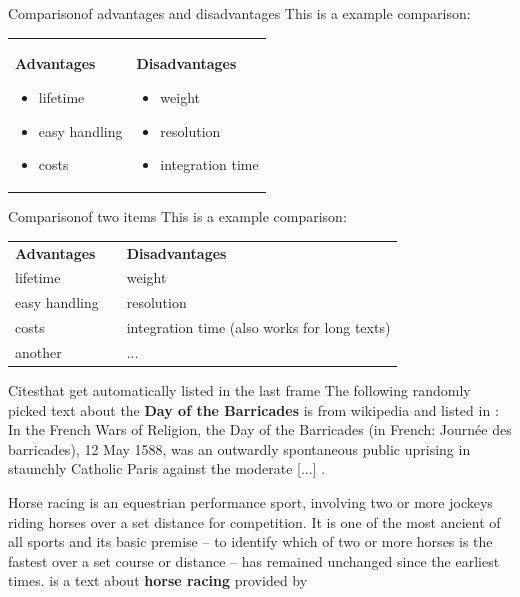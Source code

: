 \documentclass[
	12pt, 				%
	t,					%
	aspectratio=169,	%
	]{beamer}
\begin{document}
	
	\begin{frame}{Comparison}{of advantages and disadvantages}
		This is a example comparison:
		\begin{center}
		\begin{tabularx}{0.8\textwidth}{X|X}
			\textbf{Advantages}
			 \begin{itemize}[<2->]
			 	\item lifetime
			 	\item easy handling
			 	\item costs
			 \end{itemize} &
			\textbf{Disadvantages}
			 \begin{itemize}[<3->]
			 	\item weight
			 	\item resolution
			 	\item integration time
			 \end{itemize}
		\end{tabularx}
		\end{center}
	\end{frame}
	
	
	\begin{frame}{Comparison}{of two items}
		This is a example comparison:
		\begin{center}
		\begin{tabularx}{\textwidth}{XcX}
			\textbf{Advantages} & & \textbf{Disadvantages}\\
			lifetime & \drawopp & weight \\
			easy handling & \drawopp & resolution \\
			costs & \drawopp & integration time (also works for long texts)\\
			another & \drawopp & ... \\
		\end{tabularx}
		\end{center}
	\end{frame}	
	
	
	\begin{frame}{Cites}{that get automatically listed in the last frame}
		The following randomly picked text about the \textbf{Day of the Barricades} is from wikipedia and listed in \cite{art:dayofB}:
		\glqq In the French Wars of Religion, the Day of the Barricades (in French: Journée des barricades), 12 May 1588, was an outwardly spontaneous public uprising in staunchly Catholic Paris against the moderate [...] \grqq.
		
		\glqq Horse racing is an equestrian performance sport, involving two or more jockeys riding horses over a set distance for competition. It is one of the most ancient of all sports and its basic premise – to identify which of two or more horses is the fastest over a set course or distance – has remained unchanged since the earliest times. \grqq{} is a text about \textbf{horse racing} provided by \cite{art:horseRacing}
	\end{frame}
	
\end{document}
